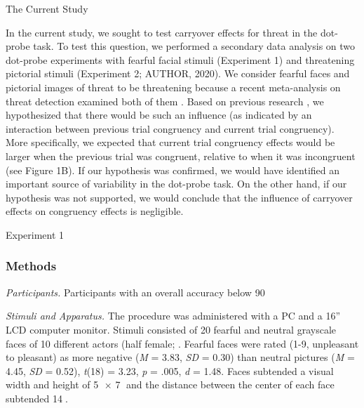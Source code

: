 \documentclass{article}
\begin{document}
	The Current Study



	In the current study, we sought to test carryover effects for threat in the dot-probe task. To test this question, we performed a secondary data analysis on two dot-probe experiments with fearful facial stimuli (Experiment 1) and threatening pictorial stimuli (Experiment 2; AUTHOR, 2020). We consider fearful faces and pictorial images of threat to be threatening because a recent meta-analysis on threat detection examined both of them \autocite{Hedger2016}. Based on previous research \autocite{Gladwin2019a}\autocite{Gladwin2020a}, we hypothesized that there would be such an influence (as indicated by an interaction between previous trial congruency and current trial congruency). More specifically, we expected that current trial congruency effects would be larger when the previous trial was congruent, relative to when it was incongruent (see Figure 1B). If our hypothesis was confirmed, we would have identified an important source of variability in the dot-probe task. On the other hand, if our hypothesis was not supported, we would conclude that the influence of carryover effects on congruency effects is negligible.



	Experiment 1



	\subsubsection{Methods}



	\emph{Participants. }Participants with an overall accuracy below 90%



	\emph{Stimuli and Apparatus. }The procedure was administered with a PC and a 16” LCD computer monitor. Stimuli consisted of 20 fearful and neutral grayscale faces of 10 different actors (half female; \autocite{Gur2002}\autocite{Lundqvist1998}. Fearful faces were rated (1-9, unpleasant to pleasant) as more negative (\emph{M} = 3.83, \emph{SD} = 0.30) than neutral pictures (\emph{M} = 4.45, \emph{SD} = 0.52), \emph{t}(18) = 3.23, \emph{p} = .005, \emph{d} = 1.48. Faces subtended a visual width and height of 5 × 7 and the distance between the center of each face subtended 14.
\end{document}

